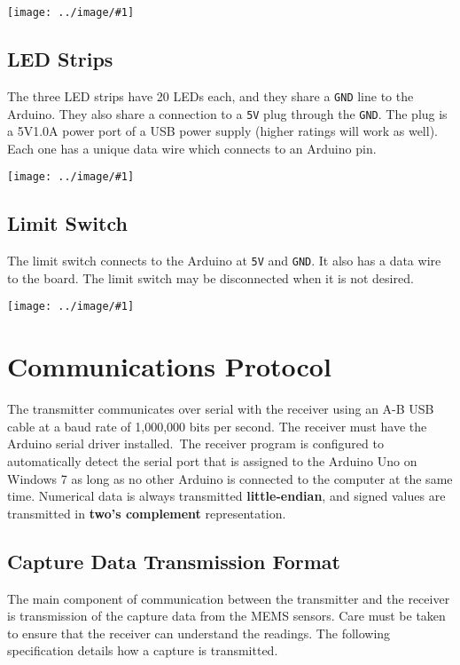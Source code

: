 \documentclass{article}
\newcommand{\img}[2]{
    \begin{center}
        \texttt{[image: ../image/\#1]}
    \end{center}    
}
\begin{document}
    \img{mems_spi_wiring}{0.562}
    
    \subsection{LED Strips}
    The three LED strips have 20 LEDs each, and they share a \texttt{GND} line to the Arduino. They also share a connection to a \texttt{5V} plug through the \texttt{GND}. The plug is a 5V1.0A power port of a USB power supply (higher ratings will work as well). Each one has a unique data wire which connects to an Arduino pin.
    
    \img{led_strip_wiring}{0.5}
    
    \subsection{Limit Switch}
    The limit switch connects to the Arduino at \texttt{5V} and \texttt{GND}. It also has a data wire to the board. The limit switch may be disconnected when it is not desired.
    \vspace{3pt}
    \img{limit_switch}{0.12}
    
    
    \section{Communications Protocol}
    The transmitter communicates over serial with the receiver using an A-B USB cable at a baud rate of 1,000,000 bits per second. The receiver must have the Arduino serial driver installed.\footnotemark\ The receiver program is configured to automatically detect the serial port that is assigned to the Arduino Uno on Windows 7 as long as no other Arduino is connected to the computer at the same time. Numerical data is always transmitted \textbf{little-endian}, and signed values are transmitted in \textbf{two's complement} representation.
    

    \subsection{Capture Data Transmission Format}
        The main component of communication between the transmitter and the receiver is transmission of the capture data from the MEMS sensors. Care must be taken to ensure that the receiver can understand the readings. The following specification details how a capture is transmitted.
\end{document}
